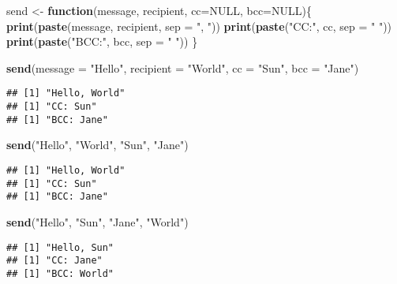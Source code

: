 \documentclass[
]{book}
\newenvironment{Shaded}{\begin{snugshade}}{\end{snugshade}}
\newcommand{\ControlFlowTok}[1]{\textcolor[rgb]{0.13,0.29,0.53}{\textbf{#1}}}
\newcommand{\DataTypeTok}[1]{\textcolor[rgb]{0.13,0.29,0.53}{#1}}
\newcommand{\KeywordTok}[1]{\textcolor[rgb]{0.13,0.29,0.53}{\textbf{#1}}}
\newcommand{\NormalTok}[1]{#1}
\newcommand{\OtherTok}[1]{\textcolor[rgb]{0.56,0.35,0.01}{#1}}
\newcommand{\StringTok}[1]{\textcolor[rgb]{0.31,0.60,0.02}{#1}}
\begin{document}
\begin{Shaded}
\begin{Highlighting}[]
\NormalTok{send \textless{}{-}}\StringTok{ }\ControlFlowTok{function}\NormalTok{(message, recipient, }\DataTypeTok{cc=}\OtherTok{NULL}\NormalTok{, }\DataTypeTok{bcc=}\OtherTok{NULL}\NormalTok{)\{}
  \KeywordTok{print}\NormalTok{(}\KeywordTok{paste}\NormalTok{(message, recipient, }\DataTypeTok{sep =} \StringTok{", "}\NormalTok{))}
  \KeywordTok{print}\NormalTok{(}\KeywordTok{paste}\NormalTok{(}\StringTok{"CC:"}\NormalTok{, cc, }\DataTypeTok{sep =} \StringTok{" "}\NormalTok{))}
  \KeywordTok{print}\NormalTok{(}\KeywordTok{paste}\NormalTok{(}\StringTok{"BCC:"}\NormalTok{, bcc, }\DataTypeTok{sep =} \StringTok{" "}\NormalTok{))}
\NormalTok{\}}

\KeywordTok{send}\NormalTok{(}\DataTypeTok{message =} \StringTok{"Hello"}\NormalTok{, }\DataTypeTok{recipient =} \StringTok{"World"}\NormalTok{, }\DataTypeTok{cc =} \StringTok{"Sun"}\NormalTok{, }\DataTypeTok{bcc =} \StringTok{"Jane"}\NormalTok{)}
\end{Highlighting}
\end{Shaded}

\begin{verbatim}
## [1] "Hello, World"
## [1] "CC: Sun"
## [1] "BCC: Jane"
\end{verbatim}

\begin{Shaded}
\begin{Highlighting}[]
\KeywordTok{send}\NormalTok{(}\StringTok{"Hello"}\NormalTok{, }\StringTok{"World"}\NormalTok{, }\StringTok{"Sun"}\NormalTok{, }\StringTok{"Jane"}\NormalTok{)}
\end{Highlighting}
\end{Shaded}

\begin{verbatim}
## [1] "Hello, World"
## [1] "CC: Sun"
## [1] "BCC: Jane"
\end{verbatim}

\begin{Shaded}
\begin{Highlighting}[]
\KeywordTok{send}\NormalTok{(}\StringTok{"Hello"}\NormalTok{, }\StringTok{"Sun"}\NormalTok{, }\StringTok{"Jane"}\NormalTok{, }\StringTok{"World"}\NormalTok{)}
\end{Highlighting}
\end{Shaded}

\begin{verbatim}
## [1] "Hello, Sun"
## [1] "CC: Jane"
## [1] "BCC: World"
\end{verbatim}
\end{document}
